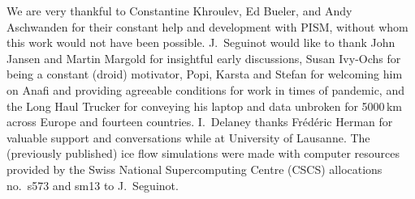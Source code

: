 \documentclass[esurf, manuscript]{copernicus}
\begin{document}





\begin{acknowledgements}
    We are very thankful to Constantine Khroulev, Ed Bueler, and Andy
    Aschwanden for their constant help and development with PISM, without whom
    this work would not have been possible. J.~Seguinot would like to thank
    John Jansen and Martin Margold for insightful early discussions, Susan
    Ivy-Ochs for being a constant (droid) motivator, Popi, Karsta and Stefan
    for welcoming him on Anafi and providing agreeable conditions for work in
    times of pandemic, and the Long Haul Trucker for conveying his laptop and
    data unbroken for 5000\,km across Europe and fourteen countries.
    I.~Delaney thanks Fr\'ed\'eric Herman for valuable support and
    conversations while at University of Lausanne.
    The (previously published) ice flow simulations were made with computer
    resources provided by the Swiss National Supercomputing Centre (CSCS)
    allocations no.~s573 and sm13 to J.~Seguinot.
\end{acknowledgements}







\end{document}
